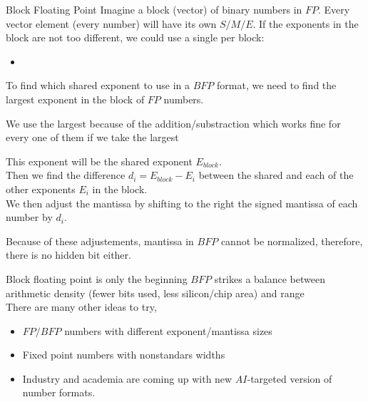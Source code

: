 \begin{parag}{Block Floating Point}
    Imagine a block (vector) of binary numbers in $FP$. Every vector element (every number) will have its own $S/M/E$. If the exponents in the block are not too different, we could use a single  per block:
    \begin{itemize}
        \item {}
    \end{itemize}
    
    To find which shared exponent to use in a $BFP$ format, we need to find the largest exponent in the block of $FP$ numbers. 
    \begin{framedremark}
        We use the largest because of the addition/substraction which works fine for every one of them if we take the largest
    \end{framedremark}
    This exponent will be the shared exponent $E_{block}$.
    \\
    Then we find the difference $d_i = E_{block} - E_i$ between the shared and each of the other exponents $E_i$ in the block.
    \\
    We then adjust the mantissa by shifting to the right the signed mantissa of each number by $d_i$. 
    \begin{framedremark}
        Because of these adjustements, mantissa in $BFP$ cannot be normalized, therefore, there is no hidden bit either.

    \end{framedremark}
    
    
\end{parag}


\begin{parag}{Block floating point is only the beginning}
    $BFP$ strikes a balance between arithmetic density (fewer bits used, less silicon/chip area) and range
    \\
    There are many other ideas to try,
    \begin{itemize}
        \item $FP/BFP$ numbers with different exponent/mantissa sizes
        \item Fixed point numbers with nonstandars widths
        \item Industry and academia are coming up with new $AI$-targeted version of number formats.
    \end{itemize}

\end{parag}
